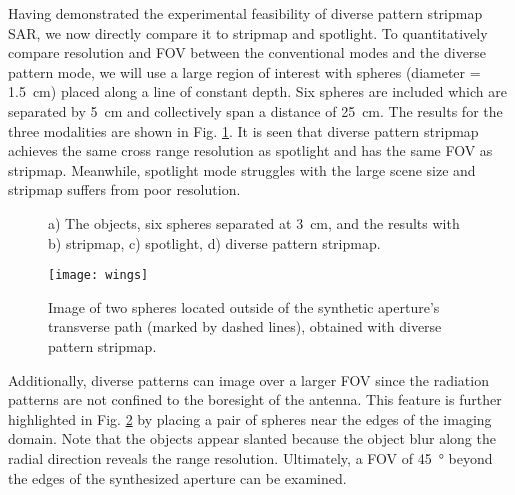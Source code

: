\documentclass[journal]{IEEEtran}
\begin{document}
Having demonstrated the experimental feasibility of diverse pattern stripmap SAR, we now directly compare it to stripmap and spotlight. To quantitatively compare resolution and FOV between the conventional modes and the diverse pattern mode, we will use a large region of interest with spheres (diameter = \SI{1.5}{\centi\meter}) placed along a line of constant depth. Six spheres are included which are separated by \SI{5}{\centi\meter} and collectively span a distance of \SI{25}{\centi\meter}. The results for the three modalities are shown in Fig. \ref{fig:f8}. It is seen that diverse pattern stripmap achieves the same cross range resolution as spotlight and has the same FOV as stripmap. Meanwhile, spotlight mode struggles with the large scene size and stripmap suffers from poor resolution.

\begin{figure}
	\centering
	\caption{\label{fig:f8}a) The objects, six spheres separated at \SI{3}{\centi\meter}, and the results with b) stripmap, c) spotlight, d) diverse pattern stripmap.}
\end{figure}

\begin{figure} 
	\centering
	\texttt{[image: wings]}
	\caption{\label{fig:f9}Image of two spheres located outside of the synthetic aperture's transverse path (marked by dashed lines), obtained with diverse pattern stripmap.}
\end{figure}

Additionally, diverse patterns can image over a larger FOV since the radiation patterns are not confined to the boresight of the antenna. This feature is further highlighted in Fig. \ref{fig:f9} by placing a pair of spheres near the edges of the imaging domain. Note that the objects appear slanted because the object blur along the radial direction reveals the range resolution. Ultimately, a FOV of \SI{45}{\degree} beyond the edges of the synthesized aperture can be examined.
\end{document}
